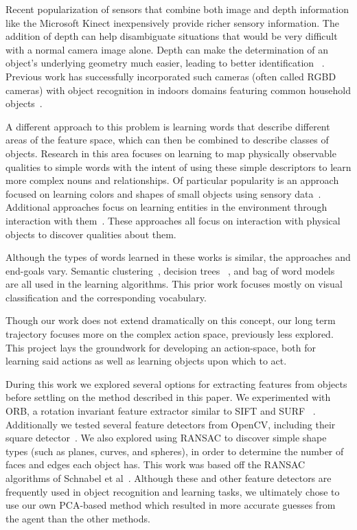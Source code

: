 \documentclass[11pt]{article}
\begin{document}
Recent popularization of sensors that combine both image and depth information
like the Microsoft Kinect inexpensively provide richer sensory information. The
addition of depth can help disambiguate situations that would be very difficult
with a normal camera image alone. Depth can make the determination of an object’s
underlying geometry much easier, leading to better identification
~\cite{marton2010hierarchical}.
Previous work has successfully incorporated such cameras (often called RGBD
cameras) with object recognition in indoors domains featuring common household
objects~\cite{marton2010hierarchical, lai2011sparse}.

A different approach to this problem is learning words that describe different
areas of the feature space, which can then be combined to describe classes of
objects. Research in this area focuses on learning to map physically observable
qualities to simple words with the intent of using these simple descriptors to
learn more complex nouns and relationships. Of particular popularity is an
approach focused on learning colors and shapes of small objects using sensory
data~\cite{zambuto2010visually, roy2002learning}. Additional approaches focus on
learning entities in the environment through interaction with
them~\cite{gold2009robotic}. These approaches all focus on interaction with
physical objects to discover qualities about them.

Although the types of words learned in these works is similar, the approaches and
end-goals vary. Semantic clustering~\cite{zambuto2010visually}, decision trees
~\cite{gold2009robotic}, and bag of word models~\cite{roy2002learning} are all
used in the learning algorithms. This prior work focuses mostly on visual
classification and the corresponding vocabulary.

Though our work does not extend dramatically on this concept, our long term
trajectory focuses more on the complex action space, previously less explored.
This project lays the groundwork for developing an action-space, both for
learning said actions as well as learning objects upon which to act.

During this work we explored several options for extracting features from
objects before settling on the method described in this paper. We experimented
with ORB, a rotation invariant feature extractor similar to SIFT and SURF
~\cite{rublee2011orb}. Additionally we tested several feature detectors from
OpenCV, including their square detector~\cite{opencv_library}. We also explored
using RANSAC to discover simple shape types (such as planes, curves, and spheres),
in order to determine the number of faces and edges each object has. This work
was based off the RANSAC algorithms of Schnabel et
al~\cite{schnabel2007efficient}. Although these and other feature detectors are
frequently used in object recognition and learning tasks, we ultimately chose to
use our own PCA-based method which resulted in more accurate guesses from the
agent than the other methods.
\end{document}
